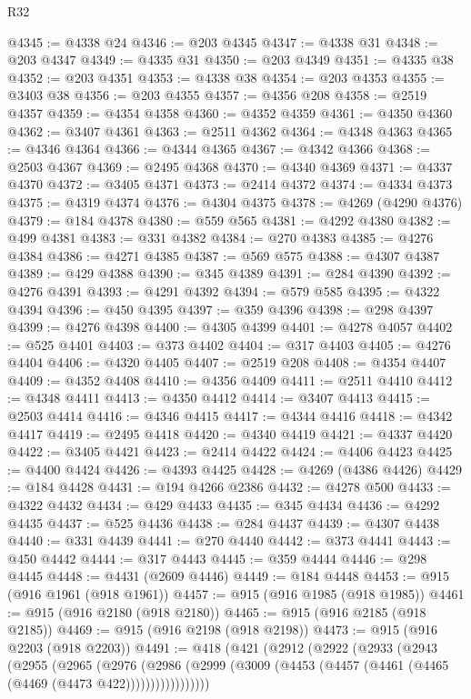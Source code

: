 \begin{lexlean}{R32}
\begin{coremodule}
@4345 := @4338 @24
@4346 := @203 @4345
@4347 := @4338 @31
@4348 := @203 @4347
@4349 := @4335 @31
@4350 := @203 @4349
@4351 := @4335 @38
@4352 := @203 @4351
@4353 := @4338 @38
@4354 := @203 @4353
@4355 := @3403 @38
@4356 := @203 @4355
@4357 := @4356 @208
@4358 := @2519 @4357
@4359 := @4354 @4358
@4360 := @4352 @4359
@4361 := @4350 @4360
@4362 := @3407 @4361
@4363 := @2511 @4362
@4364 := @4348 @4363
@4365 := @4346 @4364
@4366 := @4344 @4365
@4367 := @4342 @4366
@4368 := @2503 @4367
@4369 := @2495 @4368
@4370 := @4340 @4369
@4371 := @4337 @4370
@4372 := @3405 @4371
@4373 := @2414 @4372
@4374 := @4334 @4373
@4375 := @4319 @4374
@4376 := @4304 @4375
@4378 := @4269 (@4290 @4376)
@4379 := @184 @4378
@4380 := @559 @565
@4381 := @4292 @4380
@4382 := @499 @4381
@4383 := @331 @4382
@4384 := @270 @4383
@4385 := @4276 @4384
@4386 := @4271 @4385
@4387 := @569 @575
@4388 := @4307 @4387
@4389 := @429 @4388
@4390 := @345 @4389
@4391 := @284 @4390
@4392 := @4276 @4391
@4393 := @4291 @4392
@4394 := @579 @585
@4395 := @4322 @4394
@4396 := @450 @4395
@4397 := @359 @4396
@4398 := @298 @4397
@4399 := @4276 @4398
@4400 := @4305 @4399
@4401 := @4278 @4057
@4402 := @525 @4401
@4403 := @373 @4402
@4404 := @317 @4403
@4405 := @4276 @4404
@4406 := @4320 @4405
@4407 := @2519 @208
@4408 := @4354 @4407
@4409 := @4352 @4408
@4410 := @4356 @4409
@4411 := @2511 @4410
@4412 := @4348 @4411
@4413 := @4350 @4412
@4414 := @3407 @4413
@4415 := @2503 @4414
@4416 := @4346 @4415
@4417 := @4344 @4416
@4418 := @4342 @4417
@4419 := @2495 @4418
@4420 := @4340 @4419
@4421 := @4337 @4420
@4422 := @3405 @4421
@4423 := @2414 @4422
@4424 := @4406 @4423
@4425 := @4400 @4424
@4426 := @4393 @4425
@4428 := @4269 (@4386 @4426)
@4429 := @184 @4428
@4431 := @194 @4266 @2386
@4432 := @4278 @500
@4433 := @4322 @4432
@4434 := @429 @4433
@4435 := @345 @4434
@4436 := @4292 @4435
@4437 := @525 @4436
@4438 := @284 @4437
@4439 := @4307 @4438
@4440 := @331 @4439
@4441 := @270 @4440
@4442 := @373 @4441
@4443 := @450 @4442
@4444 := @317 @4443
@4445 := @359 @4444
@4446 := @298 @4445
@4448 := @4431 (@2609 @4446)
@4449 := @184 @4448
@4453 := @915 (@916 @1961 (@918 @1961))
@4457 := @915 (@916 @1985 (@918 @1985))
@4461 := @915 (@916 @2180 (@918 @2180))
@4465 := @915 (@916 @2185 (@918 @2185))
@4469 := @915 (@916 @2198 (@918 @2198))
@4473 := @915 (@916 @2203 (@918 @2203))
@4491 := @418
    (@421
      (@2912
        (@2922
          (@2933
            (@2943
              (@2955
                (@2965
                  (@2976
                    (@2986
                      (@2999 (@3009 (@4453 (@4457 (@4461 (@4465 (@4469 (@4473 @422)))))))))))))))))

\end{coremodule}
\end{lexlean}
